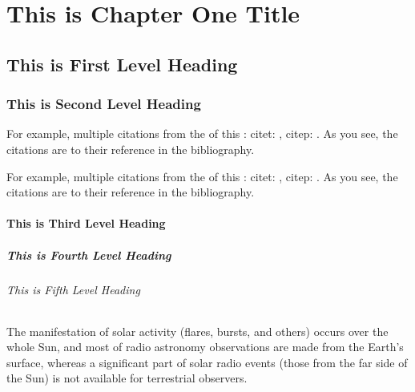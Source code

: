 
\chapter{This is Chapter One Title}

\section{This is First Level Heading}
\lipsum[1-2]

\subsection{This is Second Level Heading}
\lipsum[3]
For example, multiple citations from the  of this :
citet: \citet{CR9,CR6}, citep: \citep{CR9,CR6}.
As you see, the citations are  to their
reference in the bibliography.

For example, multiple citations from the  of this :
citet: \citet{CR9,CR6}, citep: \citep{CR9,CR6}.
As you see, the citations are  to their
reference in the bibliography.

\subsubsection{This is Third Level Heading}
\lipsum[4]

\paragraph{This is Fourth Level Heading}
\lipsum[5]

\subparagraph{This is Fifth Level Heading}
\lipsum[6]

The manifestation of solar activity (flares, bursts, and others) occurs over the whole Sun, and most of radio astronomy observations are made from the Earth's surface, whereas a significant part of solar radio events (those from the far side of the Sun) is not available for terrestrial observers.

\backmatter

%

